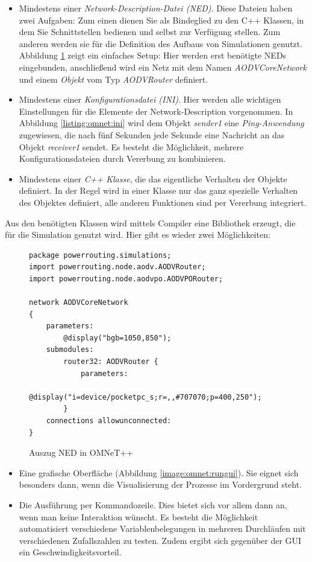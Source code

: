 \begin{itemize}
\item Mindestens einer \textit{Network-Description-Datei (NED)}. Diese Dateien haben zwei Aufgaben: Zum einen dienen Sie als Bindeglied zu den C++ Klassen, in dem Sie Schnittstellen bedienen und selbst zur Verfügung stellen. Zum anderen werden sie für die Definition des Aufbaus von Simulationen genutzt. Abbildung \ref{listing:omnet:ned} zeigt ein einfaches Setup: Hier werden erst benötigte NEDs eingebunden, anschließend wird ein Netz mit dem Namen \textit{AODVCoreNetwork} und einem \textit{Objekt} vom Typ \textit{AODVRouter} definiert.
\item Mindestens einer \textit{Konfigurationsdatei (INI)}. Hier werden alle wichtigen Einstellungen für die Elemente der Network-Description vorgenommen. In Abbildung \ref{listing:omnet:ini} wird dem Objekt \textit{sender1} eine \textit{Ping-Anwendung} zugewiesen, die nach fünf Sekunden jede Sekunde eine Nachricht an das Objekt \textit{receiver1} sendet. Es besteht die Möglichkeit, mehrere Konfigurationsdateien durch Vererbung zu kombinieren.
\item Mindestens einer \textit{C++ Klasse}, die das eigentliche Verhalten der Objekte definiert. In der Regel wird in einer Klasse nur das ganz spezielle Verhalten des Objektes definiert, alle anderen Funktionen sind per Vererbung integriert.
\end{itemize}

Aus den benötigten Klassen wird mittels Compiler eine Bibliothek erzeugt, die für die Simulation genutzt wird. Hier gibt es wieder zwei Möglichkeiten:

\begin{figure}
  \centering
  \footnotesize
  \begin{lstlisting}[frame=single]
package powerrouting.simulations;
import powerrouting.node.aodv.AODVRouter;
import powerrouting.node.aodvpo.AODVPORouter;

network AODVCoreNetwork
{
    parameters:
        @display("bgb=1050,850");
    submodules:
        router32: AODVRouter {
            parameters:
                @display("i=device/pocketpc_s;r=,,#707070;p=400,250");
        }
    connections allowunconnected:
}
  \end{lstlisting}
  \caption{Auszug NED in OMNeT++}
  \label{listing:omnet:ned}
\end{figure}

\begin{itemize}
\item Eine grafische Oberfläche (Abbildung \ref{image:omnet:rungui}). Sie eignet sich besonders dann, wenn die Visualisierung der Prozesse im Vordergrund steht.
\item Die Ausführung per Kommandozeile. Dies bietet sich vor allem dann an, wenn man keine Interaktion wünscht. Es besteht die Möglichkeit automatisiert verschiedene Variablenbelegungen in mehreren Durchläufen mit verschiedenen Zufallszahlen zu testen. Zudem ergibt sich gegenüber der GUI ein Geschwindigkeitsvorteil.
\end{itemize}

